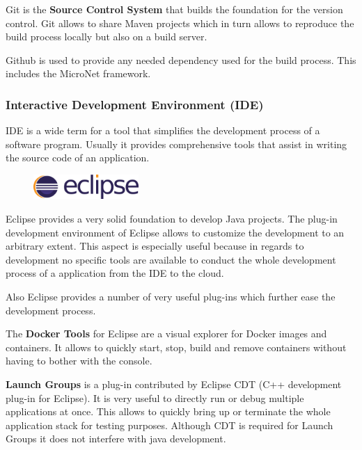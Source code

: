Git is the \textbf{Source Control System} that builds the foundation for the
version control. Git allows to share Maven projects which in turn allows to
reproduce the build process locally but also on a build server. 

Github is used to provide any needed dependency used for the build process.
This includes the MicroNet framework.

\subsubsection{Interactive Development Environment (IDE)}

IDE is a wide term for a tool that simplifies the development process of a
software program. Usually it provides comprehensive tools that assist in writing
the source code of an application.\\

\begin{figure}
    \includegraphics[width=4cm]{images/dependencies/eclipse}
\end{figure}

Eclipse provides a very solid foundation to develop Java projects. The plug-in
development environment of Eclipse allows to customize the development to an
arbitrary extent. This aspect is especially useful because in regards to \ms{}
development no specific tools are available to conduct the whole development
process of a \ms{} application from the IDE to the cloud.

Also Eclipse provides a number of very useful plug-ins which further ease the
\ms{} development process.

The \textbf{Docker Tools} for Eclipse are a visual explorer  for Docker images
and containers. It allows to quickly start, stop, build and remove containers
without having to bother with the console.

\textbf{Launch Groups} is a plug-in contributed by Eclipse CDT (C++ development
plug-in for Eclipse). It is very useful to directly run or debug multiple
applications at once. This allows to quickly bring up or terminate the whole
application stack for testing purposes. Although CDT is required for Launch
Groups it does not interfere with java development.































